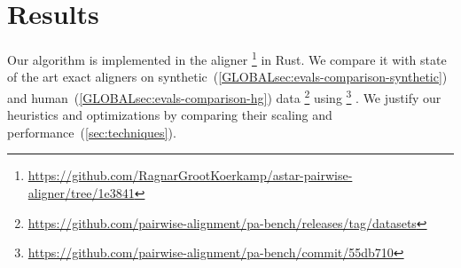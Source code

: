 \section{Results} \label{sec:evals}

Our algorithm is implemented in the aligner
\astarpa%
\footnote{\url{https://github.com/RagnarGrootKoerkamp/astar-pairwise-aligner/tree/1e3841}}
in Rust. We compare it with state of the art exact aligners on
synthetic~(\cref{GLOBALsec:evals-comparison-synthetic}) and
human~(\cref{GLOBALsec:evals-comparison-hg})
data%
\footnote{\url{https://github.com/pairwise-alignment/pa-bench/releases/tag/datasets}}
using \pabench%
\footnote{\url{https://github.com/pairwise-alignment/pa-bench/commit/55db710}}%
.
We justify our heuristics and optimizations by comparing their scaling and
performance~(\cref{sec:techniques}).







